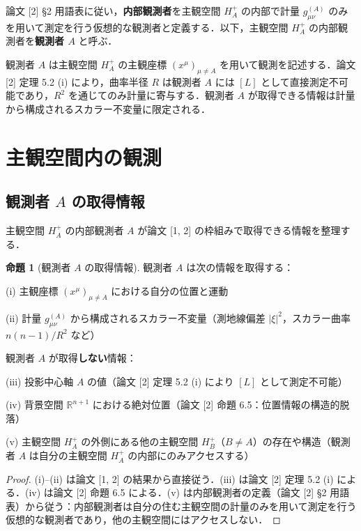 \documentclass[a4paper,11pt]{ltjsarticle}
\theoremstyle{definition}
\newtheorem{proposition}[theorem]{命題}
\begin{document}
論文 {[2]} \S2 用語表に従い，\textbf{内部観測者}を主観空間 \(H_A^+\) の内部で計量 \(g_{\mu\nu}^{(A)}\) のみを用いて測定を行う仮想的な観測者と定義する．以下，主観空間 \(H_A^+\) の内部観測者を\textbf{観測者 \(A\)} と呼ぶ．

観測者 \(A\) は主観空間 \(H_A^+\) の主観座標 \((x^\mu)_{\mu \neq A}\) を用いて観測を記述する．論文 {[2]} 定理 5.2 (i) により，曲率半径 \(R\) は観測者 \(A\) には \([L]\) として直接測定不可能であり，\(R^2\) を通じてのみ計量に寄与する．観測者 \(A\) が取得できる情報は計量から構成されるスカラー不変量に限定される．

\section{主観空間内の観測}

\subsection{観測者 \(A\) の取得情報}

主観空間 \(H_A^+\) の内部観測者 \(A\) が論文 {[1, 2]} の枠組みで取得できる情報を整理する．

\begin{proposition}[観測者 \(A\) の取得情報]
観測者 \(A\) は次の情報を取得する：

\textup{(i)} 主観座標 \((x^\mu)_{\mu \neq A}\) における自分の位置と運動

\textup{(ii)} 計量 \(g_{\mu\nu}^{(A)}\) から構成されるスカラー不変量（測地線偏差 \(|\xi|^2\)，スカラー曲率 \(n(n-1)/R^2\) など）

\medskip
観測者 \(A\) が取得\textbf{しない}情報：

\textup{(iii)} 投影中心軸 \(A\) の値（論文 {[2]} 定理 5.2 (i) により \([L]\) として測定不可能）

\textup{(iv)} 背景空間 \(\mathbb{R}^{n+1}\) における絶対位置（論文 {[2]} 命題 6.5：位置情報の構造的脱落）

\textup{(v)} 主観空間 \(H_A^+\) の外側にある他の主観空間 \(H_B^+\)（\(B \neq A\)）の存在や構造（観測者 \(A\) は自分の主観空間 \(H_A^+\) の内部にのみアクセスする）
\end{proposition}

\begin{proof}
(i)--(ii) は論文 {[1, 2]} の結果から直接従う．(iii) は論文 {[2]} 定理 5.2 (i) による．(iv) は論文 {[2]} 命題 6.5 による．(v) は内部観測者の定義（論文 {[2]} \S2 用語表）から従う：内部観測者は自分の住む主観空間の計量のみを用いて測定を行う仮想的な観測者であり，他の主観空間にはアクセスしない．
\end{proof}
\end{document}
